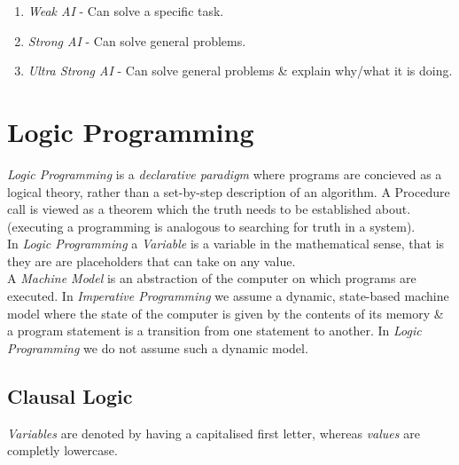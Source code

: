 \documentclass[11pt,a4paper]{article}
\begin{document}
\begin{enumerate}
	\item \textit{Weak AI} - Can solve a specific task.
	\item \textit{Strong AI} - Can solve general problems.
	\item \textit{Ultra Strong AI} - Can solve general problems \& explain why/what it is doing.
\end{enumerate}

\section{Logic Programming}

\textit{Logic Programming} is a \textit{declarative paradigm} where programs are concieved as a logical theory, rather than a set-by-step description of an algorithm. A Procedure call is viewed as a theorem which the truth needs to be established about. (\ie executing a programming is analogous to searching for truth in a system).\\

In \textit{Logic Programming} a \textit{Variable} is a variable in the mathematical sense, that is they are are placeholders that can take on any value.\\

A \textit{Machine Model} is an abstraction of the computer on which programs are executed. In \textit{Imperative Programming} we assume a dynamic, state-based machine model where the state of the computer is given by the contents of its memory \& a program statement is a transition from one statement to another. In \textit{Logic Programming} we do not assume such a dynamic model.

\subsection{Clausal Logic}

\textit{Variables} are denoted by having a capitalised first letter, whereas \textit{values} are completly lowercase.\\
\end{document}
